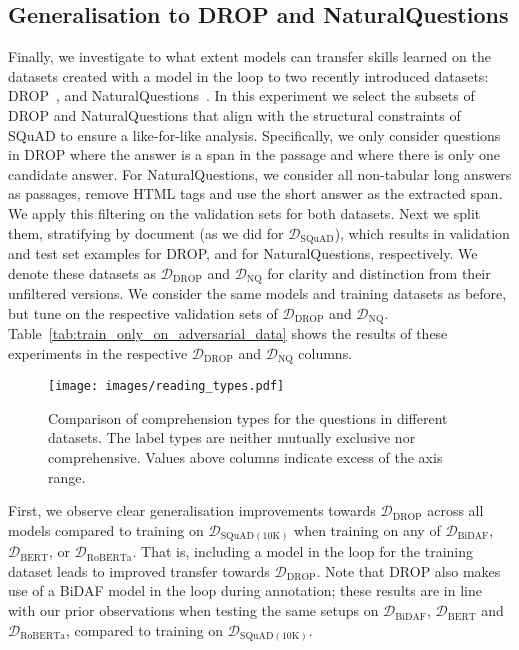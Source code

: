 \documentclass[11pt,a4paper]{article}
\newcommand{\dataset}[1]{\ensuremath{\mathcal{D_{\mathrm{#1}}}}}
\newcommand{\squad}{SQuAD}
\newcommand{\drop}{DROP}
\newcommand{\naturalquestions}{NaturalQuestions}
\begin{document}
\subsection{Generalisation to DROP and NaturalQuestions}
Finally, we investigate to what extent models can transfer skills learned on the datasets created with a model in the loop to two recently introduced datasets: \drop{}~\cite{dua2019drop}, and \naturalquestions{}~\cite{kwiatkowski-etal-2019-natural}.
In this experiment we select the subsets of \drop{} and \naturalquestions{} that align with the structural constraints of \squad{} to ensure a like-for-like analysis.
Specifically, we only consider questions in \drop{} where the answer is a span in the passage and where there is only one candidate answer. 
For \naturalquestions{}, we consider all non-tabular long answers as passages, remove HTML tags and use the short answer as the extracted span. 
We apply this filtering on the validation sets for both datasets.
Next we split them, stratifying by document (as we did for \dataset{\squad{}}), which results in  validation and test set examples for \drop{}, and  for \naturalquestions{}, respectively.
We denote these datasets as \dataset{DROP} and \dataset{NQ} for clarity and distinction from their unfiltered versions. 
We consider the same models and training datasets as before, but tune on the respective validation sets of \dataset{DROP} and \dataset{NQ}.
Table~\ref{tab:train_only_on_adversarial_data} shows the results of these experiments in the respective \dataset{DROP} and \dataset{NQ} columns.


\begin{figure*}[t]
\texttt{[image: images/reading\_types.pdf]}
\caption{Comparison of comprehension types for the questions in different datasets. The label types are neither mutually exclusive nor comprehensive. Values above columns indicate excess of the axis range.}\label{fig:reading_types}
\end{figure*}

First, we observe clear generalisation improvements towards \dataset{DROP} across all models compared to training on \dataset{SQuAD(10K)} when training on any of \dataset{BiDAF}, \dataset{BERT}, or \dataset{RoBERTa}.
That is, including a model in the loop for the training dataset leads to improved transfer towards \dataset{DROP}.
Note that \drop{} also makes use of a BiDAF model in the loop during annotation; these results are in line with our prior observations when testing the same setups on \dataset{BiDAF}, \dataset{BERT} and \dataset{RoBERTa}, compared to training on \dataset{SQuAD(10K)}.
\end{document}
